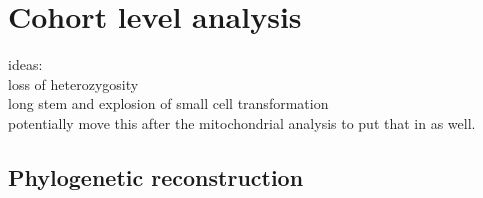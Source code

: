 

\section{Cohort level analysis}
\label{cascade-sec:cohortLevel}

ideas:\\
loss of heterozygosity \\
long stem and explosion of small cell transformation\\
potentially move this after the mitochondrial analysis to put that in as well.


\subsection{Phylogenetic reconstruction}
\label{cascade-sec:phylocohort}


